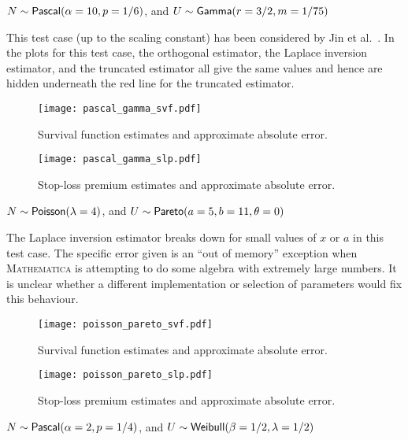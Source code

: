 \begin{test}
$N\sim\mathsf{Pascal}(\alpha=10,p=1/6)$, and $U\sim\mathsf{Gamma}(r=3/2,m=1/75)$
\end{test}

This test case (up to the scaling constant) has been considered by Jin et al.\ \cite[Example 3]{JiPrRe16}. In the plots for this test case, the orthogonal estimator, the Laplace inversion estimator, and the truncated estimator all give the same values and hence are hidden underneath the red line for the truncated estimator.

\begin{figure}[H]
\centering
\texttt{[image: pascal\_gamma\_svf.pdf]}
\caption{Survival function estimates and approximate absolute error.}
\end{figure}

\begin{figure}[H]
\centering
\texttt{[image: pascal\_gamma\_slp.pdf]}
\caption{Stop-loss premium estimates and approximate absolute error.}
\end{figure}

\begin{test} \label{test:poiss_pareto} $N\sim\mathsf{Poisson}(\lambda=4)$, and $U\sim\mathsf{Pareto}(a=5,b=11,\theta=0)$
\end{test}
The Laplace inversion estimator breaks down for small values of $x$ or $a$ in this test case. The specific error given is an ``out of memory'' exception when \textsc{Mathematica} is attempting to do some algebra with extremely large numbers. It is unclear whether a different implementation or selection of parameters would fix this behaviour.

\begin{figure}[H]
\centering
\texttt{[image: poisson\_pareto\_svf.pdf]}
\caption{Survival function estimates and approximate absolute error.}
\end{figure}

\begin{figure}[H]
\centering
\texttt{[image: poisson\_pareto\_slp.pdf]}
\caption{Stop-loss premium estimates and approximate absolute error.}
\end{figure}

\begin{test} $N \sim \mathsf{Pascal}(\alpha=2,p=1/4)$, and $U \sim \mathsf{Weibull}(\beta=1/2,\lambda=1/2)$
\end{test}


